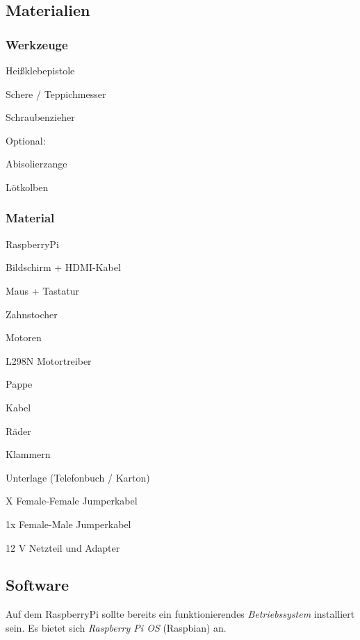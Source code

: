 \subsection{Materialien}

\subsubsection{Werkzeuge}
\begin{checklist}
    \item Heißklebepistole
    \item Schere / Teppichmesser
    \item Schraubenzieher

    \begin{checklist}
    \item[] Optional:
    \item Abisolierzange
    \item Lötkolben
    \end{checklist}
\end{checklist}

\subsubsection{Material}
\begin{checklist}
    \item RaspberryPi
    \item Bildschirm + HDMI-Kabel
    \item Maus + Tastatur
    \item Zahnstocher
    \item Motoren
    \item L298N Motortreiber
    \item Pappe
    \item Kabel
    \item Räder
    \item Klammern
    \item Unterlage (Telefonbuch / Karton)
    \item X Female-Female Jumperkabel
    \item 1x Female-Male Jumperkabel
    \item 12 V Netzteil und Adapter
\end{checklist}


\subsection{Software}
Auf dem RaspberryPi sollte bereits ein funktionierendes \emph{Betriebssystem} installiert sein. Es bietet sich \emph{Raspberry Pi OS} (Raspbian) an. \\

